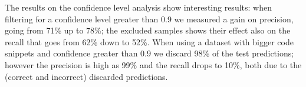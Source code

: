 The results on the confidence level analysis show interesting results: when filtering for a confidence level greater than 0.9 we measured a gain on precision, going from 71\% up to 78\%; the excluded samples shows their effect also on the recall that goes from 62\% down to 52\%. When using a dataset with bigger code snippets and confidence greater than 0.9 we discard 98\% of the test predictions; however the precision is high as 99\% and the recall drops to 10\%, both due to the (correct and incorrect) discarded predictions.







